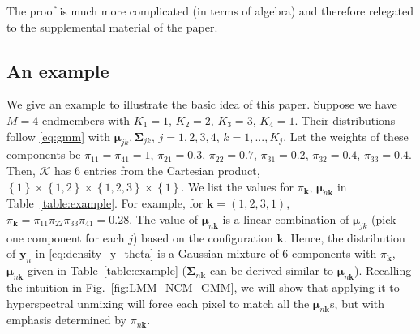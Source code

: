 \documentclass[twocolumn,english]{IEEEtran}
\theoremstyle{plain}
\begin{document}
The proof is much more complicated (in terms of algebra) and therefore
relegated to the supplemental material of the paper. 

\subsection{An example\label{subsec:An-example}}

We give an example to illustrate the basic idea of this paper. Suppose
we have $M=4$ endmembers with $K_{1}=1$, $K_{2}=2$, $K_{3}=3$,
$K_{4}=1$. Their distributions follow \eqref{eq:gmm} with $\boldsymbol{\mu}_{jk},\boldsymbol{\Sigma}_{jk}$,
$j=1,2,3,4$, $k=1,...,K_{j}$. Let the weights of these components
be $\pi_{11}=\pi_{41}=1$, $\pi_{21}=0.3$, $\pi_{22}=0.7$, $\pi_{31}=0.2$,
$\pi_{32}=0.4$, $\pi_{33}=0.4$. Then, $\mathcal{K}$ has 6 entries
from the Cartesian product, $\left\{ 1\right\} \times\left\{ 1,2\right\} \times\left\{ 1,2,3\right\} \times\left\{ 1\right\} $.
We list the values for $\pi_{\mathbf{k}}$, $\boldsymbol{\mu}_{n\mathbf{k}}$
in Table~\ref{table:example}. For example, for $\mathbf{k}=\left(1,2,3,1\right)$,
$\pi_{\mathbf{k}}=\pi_{11}\pi_{22}\pi_{33}\pi_{41}=0.28$. The value
of $\boldsymbol{\mu}_{n\mathbf{k}}$ is a linear combination of $\boldsymbol{\mu}_{jk}$
(pick one component for each $j$) based on the configuration $\mathbf{k}$.
Hence, the distribution of $\mathbf{y}_{n}$ in \eqref{eq:density_y_theta}
is a Gaussian mixture of 6 components with $\pi_{\mathbf{k}}$, $\boldsymbol{\mu}_{n\mathbf{k}}$
given in Table~\ref{table:example} ($\boldsymbol{\Sigma}_{n\mathbf{k}}$
can be derived similar to $\boldsymbol{\mu}_{n\mathbf{k}}$). Recalling
the intuition in Fig.~\ref{fig:LMM_NCM_GMM}, we will show that applying
it to hyperspectral unmixing will force each pixel to match all the
$\boldsymbol{\mu}_{n\mathbf{k}}$s, but with emphasis determined by
$\pi_{n\mathbf{k}}$.
\end{document}
